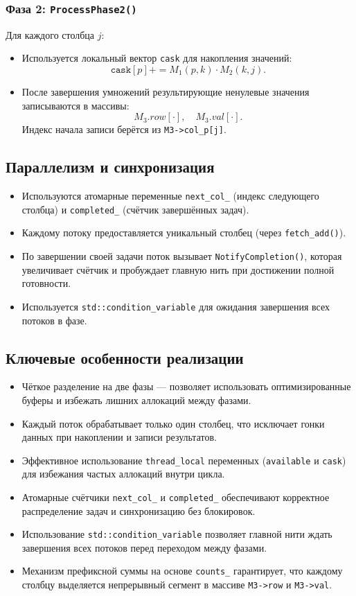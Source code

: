 \documentclass[12pt]{article}
\begin{document}
\subsubsection*{Фаза 2: \texttt{ProcessPhase2()}}

Для каждого столбца \(j\):
\begin{itemize}
  \item Используется локальный вектор \texttt{cask} для накопления значений:
  \[
    \texttt{cask}[p] += M_1(p,k) \cdot M_2(k,j).
  \]
  \item После завершения умножений результирующие ненулевые значения записываются в массивы:
  \[
    M_3.row[\cdot],\quad M_3.val[\cdot].
  \]
  Индекс начала записи берётся из \texttt{M3->col\_p[j]}.
\end{itemize}

\subsection*{Параллелизм и синхронизация}

\begin{itemize}
  \item Используются атомарные переменные \texttt{next\_col\_} (индекс следующего столбца) и \texttt{completed\_} (счётчик завершённых задач).
  \item Каждому потоку предоставляется уникальный столбец (через \texttt{fetch\_add()}).
  \item По завершении своей задачи поток вызывает \texttt{NotifyCompletion()}, которая увеличивает счётчик и пробуждает главную нить при достижении полной готовности.
  \item Используется \texttt{std::condition\_variable} для ожидания завершения всех потоков в фазе.
\end{itemize}

\subsection*{Ключевые особенности реализации}

\begin{itemize}
  \item Чёткое разделение на две фазы — позволяет использовать оптимизированные буферы и избежать лишних аллокаций между фазами.
  \item Каждый поток обрабатывает только один столбец, что исключает гонки данных при накоплении и записи результатов.
  \item Эффективное использование \texttt{thread\_local} переменных (\texttt{available} и \texttt{cask}) для избежания частых аллокаций внутри цикла.
  \item Атомарные счётчики \texttt{next\_col\_} и \texttt{completed\_} обеспечивают корректное распределение задач и синхронизацию без блокировок.
  \item Использование \texttt{std::condition\_variable} позволяет главной нити ждать завершения всех потоков перед переходом между фазами.
  \item Механизм префиксной суммы на основе \texttt{counts\_} гарантирует, что каждому столбцу выделяется непрерывный сегмент в массиве \texttt{M3->row} и \texttt{M3->val}.
\end{itemize}
\end{document}
